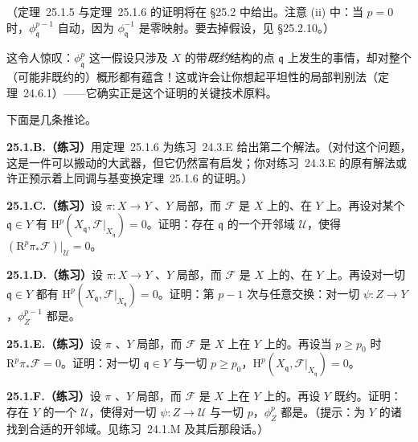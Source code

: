 （\mbox{定理~25.1.5} 与\mbox{定理~25.1.6} 的证明将在 \S25.2 中给出。注意 (ii) 中：当 $p=0$ 时，$\phi^{p-1}_{\mathfrak{q}}$ 自动\trSurjectiveMap，因为 $\phi^{-1}_{\mathfrak{q}}$ 是零映射。要去掉\trNoether{}假设，见 \S25.2.10。）

这令人惊叹：$\phi^p_{\mathfrak{q}}$ \trSurjectiveMap{}这一假设只涉及 $X$ 的带\emph{既约}结构的点 $\mathfrak{q}$ 上发生的事情，却对整个（可能非既约的）概形都有蕴含！这或许会让你想起平坦性的局部判别法（\mbox{定理~24.6.1}）——它确实正是这个证明的关键技术原料。

下面是几条推论。

\textbf{25.1.B.（练习）}\quad 用\mbox{定理~25.1.6} 为\mbox{练习~24.3.E} 给出第二个解法。（对付这个问题，这是一件可以搬动的大武器，但它仍然富有启发；你对\mbox{练习~24.3.E} 的原有解法或许正预示着\mbox{上同调与基变换定理~25.1.6} 的证明。）

\textbf{25.1.C.（练习）}\quad 设 $\pi\colon X\to Y$ \trProper、$Y$ 局部\trNoether，而 $\mathscr{F}$ 是 $X$ 上的\trCoherentSheaf、在 $Y$ 上\trFlat。再设对某个 $\mathfrak{q}\in Y$ 有 $\mathrm{H}^p(X_{\mathfrak{q}},\mathscr{F}|_{X_{\mathfrak{q}}})=0$。证明：存在 $\mathfrak{q}$ 的一个开邻域 $\mathscr{U}$，使得 $(\mathrm{R}^p\pi_*\mathscr{F})|_{\mathscr{U}}=0$。

\textbf{25.1.D.（练习）}\quad 设 $\pi\colon X\to Y$ \trProper、$Y$ 局部\trNoether，而 $\mathscr{F}$ 是 $X$ 上的\trCoherentSheaf、在 $Y$ 上\trFlat。再设对一切 $\mathfrak{q}\in Y$ 都有 $\mathrm{H}^p(X_{\mathfrak{q}},\mathscr{F}|_{X_{\mathfrak{q}}})=0$。证明：第 $p-1$ 次\trCohomology{}与任意\trBaseChange{}交换：对一切 $\psi\colon Z\to Y$，$\phi^{p-1}_Z$ 都是\trIsomorphism。

\textbf{25.1.E.（练习）}\quad 设 $\pi$ \trProper、$Y$ 局部\trNoether，而 $\mathscr{F}$ 是 $X$ 上在 $Y$ 上\trFlat{}的\trCoherentSheaf。再设当 $p\ge p_0$ 时 $\mathrm{R}^p\pi_*\mathscr{F}=0$。证明：对一切 $\mathfrak{q}\in Y$ 与一切 $p\ge p_0$，$\mathrm{H}^p(X_{\mathfrak{q}},\mathscr{F}|_{X_{\mathfrak{q}}})=0$。

\textbf{25.1.F.（练习）}\quad 设 $\pi$ \trProper、$Y$ 局部\trNoether，而 $\mathscr{F}$ 是 $X$ 上在 $Y$ 上\trFlat{}的\trCoherentSheaf。再设 $Y$ 既约。证明：存在 $Y$ 的一个\trDense\trOpenSubset{} $\mathscr{U}$，使得对一切 $\psi\colon Z\to\mathscr{U}$ 与一切 $p$，$\phi^p_Z$ 都是\trIsomorphism。（提示：为 $Y$ 的诸\trGenericPoint{}找到合适的开邻域。见\mbox{练习~24.1.M} 及其后那段话。）

